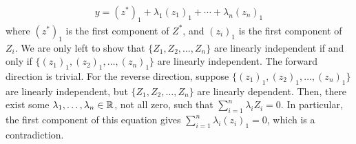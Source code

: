 \begin{align}
    y = (z^{\ast})_{1} + \lambda_{1} (z_{1})_{1} + \cdots + \lambda_{n} (z_{n})_{1}
\end{align}
where $(z^{\ast})_{1}$ is the first component of $Z^{\ast}$, and $(z_{i})_{1}$ is the first component of $Z_{i}$. We are only left to show that $\{Z_{1},Z_{2},\ldots,Z_{n}\}$ are linearly independent if and only if $\{(z_{1})_{1},(z_{2})_{1},\ldots,(z_{n})_{1}\}$ are linearly independent. The forward direction is trivial. For the reverse direction, suppose $\{(z_{1})_{1},(z_{2})_{1},\ldots,(z_{n})_{1}\}$ are linearly independent, but $\{Z_{1},Z_{2},\ldots,Z_{n}\}$ are linearly dependent. Then, there exist some $\lambda_{1},\ldots,\lambda_{n} \in \mathbb{R}$, not all zero, such that $\sum_{i=1}^{n} \lambda_{i} Z_{i} = 0$. In particular, the first component of this equation gives $\sum_{i=1}^{n} \lambda_{i} (z_{i})_{1} = 0$, which is a contradiction.\\

